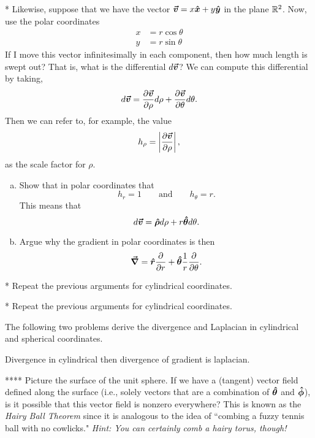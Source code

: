 \documentclass[12pt]{article} %
\begin{document}
\vspace*{1cm}
\begin{problem} *
    Likewise, suppose that we have the vector $\boldsymbol{\boldsymbol{\vec{v}}} = x\boldsymbol{\hat{x}} + y\boldsymbol{\hat{y}}$ in the plane $\mathbb{R}^2$.  Now, use the polar coordinates
    \begin{align*}
    x &= r \cos \theta\\
    y &= r \sin \theta
    \end{align*}
    If I move this vector infinitesimally in each component, then how much length is swept out? That is, what is the differential $d\boldsymbol{\boldsymbol{\vec{v}}}$? We can compute this differential by taking,
    \[
    d\boldsymbol{\boldsymbol{\vec{v}}} = \frac{\partial \boldsymbol{\boldsymbol{\vec{v}}}}{\partial \rho}d\rho+\frac{\partial \boldsymbol{\boldsymbol{\vec{v}}}}{\partial \theta}d\theta.
    \]
    Then we can refer to, for example, the value
        \[
        h_\rho = \left| \frac{\partial \boldsymbol{\boldsymbol{\vec{v}}}}{\partial \rho} \right|,
        \]
        as the scale factor for $\rho$.
    \begin{enumerate}[(a)]
        \item Show that in polar coordinates that
        \[
        h_r = 1 \qquad \textrm{and} \qquad h_\theta = r.
        \]
        This means that
        \[
        d\boldsymbol{\boldsymbol{\vec{v}}} =  \boldsymbol{\boldsymbol{\hat{\rho}}} d\rho + r\boldsymbol{\boldsymbol{\hat{\theta}}} d\theta.
        \]
        \item Argue why the gradient in polar coordinates is then
        \[
        \boldsymbol{\vec{\nabla}} = \boldsymbol{\boldsymbol{\hat{r}}} \frac{\partial}{\partial r} + \boldsymbol{\boldsymbol{\hat{\theta}}} \frac{1}{r}\frac{\partial}{\partial \theta}.
        \]
    \end{enumerate}
\end{problem}

\vspace*{1cm}
\begin{problem}
    * Repeat the previous arguments for cylindrical coordinates.
\end{problem}

\vspace*{1cm}
\begin{problem}
    * Repeat the previous arguments for cylindrical coordinates.
\end{problem}

\vspace*{1cm}
\begin{centering} The following two problems derive the divergence and Laplacian in cylindrical and spherical coordinates.
\end{centering}

\vspace*{1cm}
\begin{problem}
    Divergence in cylindrical then divergence of gradient is laplacian.
\end{problem}


\vspace*{1cm}
\begin{problem}
    **** Picture the surface of the unit sphere.  If we have a (tangent) vector field defined along the surface (i.e., solely vectors that are a combination of $\boldsymbol{\boldsymbol{\hat{\theta}}}$ and $\boldsymbol{\boldsymbol{\hat{\phi}}}$), is it possible that this vector field is nonzero everywhere? This is known as the \emph{Hairy Ball Theorem} since it is analogous to the idea of ``combing a fuzzy tennis ball with no cowlicks." \emph{Hint: You can certainly comb a hairy torus, though!}
\end{problem}
\end{document}
